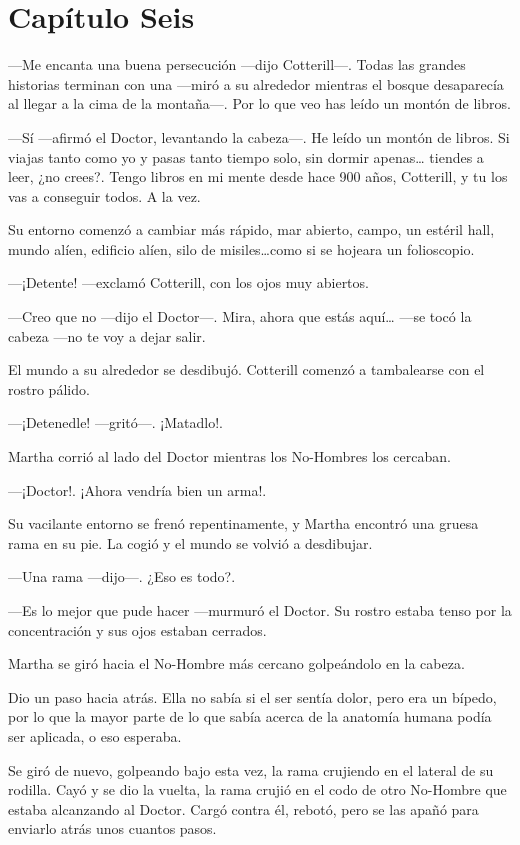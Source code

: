 \chapter*{Capítulo Seis} 

---Me encanta una buena persecución ---dijo Cotterill---. Todas las grandes historias terminan con una ---miró a su alrededor mientras el bosque desaparecía al llegar a la cima de la montaña---. Por lo que veo has leído un montón de libros.

---Sí ---afirmó el Doctor, levantando la cabeza---. He leído un montón de libros. Si viajas tanto como yo y pasas tanto tiempo solo, sin dormir apenas\ldots{} tiendes a leer, ¿no crees?. Tengo libros en mi mente desde hace 900 años, Cotterill, y tu los vas a conseguir todos. A la vez.

Su entorno comenzó a cambiar más rápido, mar abierto, campo, un estéril hall, mundo alíen, edificio alíen, silo de misiles\ldots{}como si se hojeara un folioscopio.

---¡Detente! ---exclamó Cotterill, con los ojos muy abiertos.

---Creo que no ---dijo el Doctor---. Mira, ahora que estás aquí\ldots{} ---se tocó la cabeza ---no te voy a dejar salir.

El mundo a su alrededor se desdibujó. Cotterill comenzó a tambalearse con el rostro pálido.

---¡Detenedle! ---gritó---. ¡Matadlo!.

Martha corrió al lado del Doctor mientras los No-Hombres los cercaban.

---¡Doctor!. ¡Ahora vendría bien un arma!.

Su vacilante entorno se frenó repentinamente, y Martha encontró una gruesa rama en su pie. La cogió y el mundo se volvió a desdibujar.

---Una rama ---dijo---. ¿Eso es todo?.

---Es lo mejor que pude hacer ---murmuró el Doctor. Su rostro estaba tenso por la concentración y sus ojos estaban cerrados.

Martha se giró hacia el No-Hombre más cercano golpeándolo en la cabeza.

Dio un paso hacia atrás. Ella no sabía si el ser sentía dolor, pero era un bípedo, por lo que la mayor parte de lo que sabía acerca de la anatomía humana podía ser aplicada, o eso esperaba.

Se giró de nuevo, golpeando bajo esta vez, la rama crujiendo en el lateral de su rodilla. Cayó y se dio la vuelta, la rama crujió en el codo de otro No-Hombre que estaba alcanzando al Doctor. Cargó contra él, rebotó, pero se las apañó para enviarlo atrás unos cuantos pasos.

